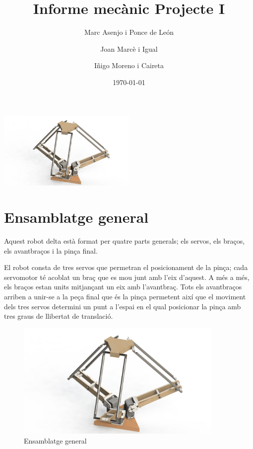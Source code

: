 \documentclass[a4paper, 12pt]{article}
\begin{document}
\title{Informe mecànic Projecte I}
\author{Marc Asenjo i Ponce de León \and
		Joan Marcè i Igual \and
		Iñigo Moreno i Caireta}
\date{\today}
\maketitle
\begin{center}
\includegraphics[width=0.5\textwidth]{./imgComp/logo}
\end{center}

\newpage
\tableofcontents{}

\newpage
\section{Ensamblatge general}

Aquest robot delta està format per quatre parts generals; els servos, els braços, els avantbraços i la pinça final. 

El robot consta de tres servos que permetran el posicionament de la pinça; cada servomotor té acoblat un braç que es mou junt amb l'eix d'aquest. A més a més, els
braços estan units mitjançant un eix amb l'avantbraç. Tots els avantbraços arriben a unir-se a la peça final que és la pinça permetent així que el moviment dels tres servos determini un punt a l'espai en el qual posicionar la pinça amb tres graus de llibertat de translació.

\begin{figure}[h!]
\centering
\includegraphics[width=10cm]{./imgComp/general}
\caption{Ensamblatge general}
\end{figure}
\end{document}
